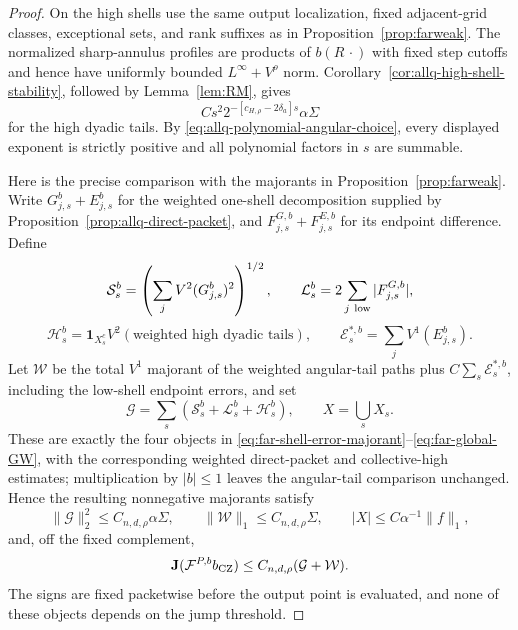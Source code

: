 \documentclass[11pt]{article}
\numberwithin{equation}{section}
\theoremstyle{remark}
\theoremstyle{definition}
\begin{document}
\begin{proof}
On the high shells use the same output localization, fixed adjacent-grid
classes, exceptional sets, and rank suffixes as in
Proposition~\ref{prop:farweak}. The normalized sharp-annulus profiles are
products of $b(R\,\cdot)$ with fixed step cutoffs and hence have uniformly
bounded $L^\infty+V^\rho$ norm. Corollary~\ref{cor:allq-high-shell-stability}, followed by Lemma~\ref{lem:RM},
gives
\[
 Cs^2 2^{-[c_{H,\rho}-2\delta_a]s}\alpha\Sigma
\]
for the high dyadic tails. By
\eqref{eq:allq-polynomial-angular-choice}, every displayed exponent is
strictly positive and all polynomial factors in $s$ are summable.

Here is the precise comparison with the majorants in
Proposition~\ref{prop:farweak}.  Write
$G^b_{j,s}+E^b_{j,s}$ for the weighted one-shell decomposition supplied
by Proposition~\ref{prop:allq-direct-packet}, and
$F^{G,b}_{j,s}+F^{E,b}_{j,s}$ for its endpoint difference.  Define
\[
 \mathcal S_s^b=\left(\sum_jV^2(G^b_{j,s})^2\right)^{1/2},\qquad
 \mathcal L_s^b=2\sum_{j\ {\rm low}}|F^{G,b}_{j,s}|,
\]
\[
 \mathcal H_s^b=\mathbf1_{X_s^c}
 V^2(\text{weighted high dyadic tails}),\qquad
 \mathcal E_s^{*,b}=\sum_jV^1(E^b_{j,s}).
\]
Let $\mathcal W$ be the total $V^1$ majorant of the weighted angular-tail
paths plus $C\sum_s\mathcal E_s^{*,b}$, including the low-shell endpoint
errors, and set
\[
 \mathcal G=\sum_s(\mathcal S_s^b+\mathcal L_s^b+\mathcal H_s^b),
 \qquad X=\bigcup_sX_s.
\]
These are exactly the four objects in
\eqref{eq:far-shell-error-majorant}--\eqref{eq:far-global-GW}, with the
corresponding weighted direct-packet and collective-high estimates; multiplication
by $|b|\le1$ leaves the angular-tail comparison unchanged.  Hence the
resulting nonnegative majorants satisfy
\[
 \|\mathcal G\|_2^2\le C_{n,d,\rho}\alpha\Sigma,\qquad
 \|\mathcal W\|_1\le C_{n,d,\rho}\Sigma,\qquad
 |X|\le C\alpha^{-1}\|f\|_1,
\]
and, off the fixed complement,
\[
 \mathbf J(\mathcal F^{P,b}b_{\rm CZ})
 \le C_{n,d,\rho}(\mathcal G+\mathcal W).
\]
The signs are fixed packetwise before the output point is evaluated, and
none of these objects depends on the jump threshold.


\end{proof}
\end{document}
